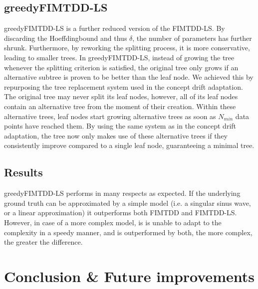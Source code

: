\documentclass[a4paper,pt12]{article}
\begin{document}
\subsection{greedyFIMTDD-LS}
greedyFIMTDD-LS is a further reduced version of the FIMTDD-LS. By discarding the Hoeffdingbound and thus $\delta$, the number of parameters has further shrunk. Furthermore, by reworking the splitting process, it is more conservative, leading to smaller trees.\newline
In greedyFIMTDD-LS, instead of growing the tree whenever the splitting criterion is satisfied, the original tree only grows if an alternative subtree is proven to be better than the leaf node.\newline
We achieved this by repurposing the tree replacement system used in the concept drift adaptation. The original tree may never split its leaf nodes, however, all of its leaf nodes contain an alternative tree from the moment of their creation. Within these alternative trees, leaf nodes start growing alternative trees as soon as $N_{min}$ data points have reached them. By using the same system as in the concept drift adaptation, the tree now only makes use of these alternative trees if they consistently improve compared to a single leaf node, guaranteeing a minimal tree.

\subsection{Results}
greedyFIMTDD-LS performs in many respects as expected. If the underlying ground truth can be approximated by a simple model (i.e. a singular sinus wave, or a linear approximation) it outperforms both FIMTDD and FIMTDD-LS. However, in case of a more complex model, is is unable to adapt to the complexity in a speedy manner, and is outperformed by both, the more complex, the greater the difference.
\section{Conclusion \& Future improvements}

%
%


\nocite{*}

\end{document}
